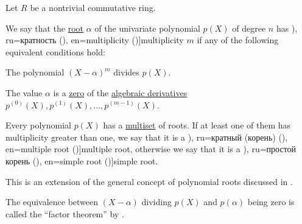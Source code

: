 \begin{definition}\label{def:multiple_root}\mimprovised
  Let \( R \) be a nontrivial commutative ring.

  We say that the \hyperref[def:root_of_polynomial]{root} \( \alpha \) of the univariate polynomial \( p(X) \) of degree \( n \) has \term[bg=кратност (\cite[171]{Обрешков1962ВисшаАлгебра}), ru=кратность (\cite[163]{Тыртышников2017Алгебра}), en=multiplicity (\cite[229]{Jacobson1985AlgebraI})]{multiplicity} \( m \) if any of the following equivalent conditions hold:
  \begin{thmenum}
     The polynomial \( (X - \alpha)^m \) divides \( p(X) \).

     The value \( \alpha \) is a \hyperref[def:root_of_polynomial]{zero} of the \hyperref[def:algebraic_derivative]{algebraic derivatives} \( p^{(0)}(X), p^{(1)}(X), \ldots, p^{(m-1)}(X) \).
  \end{thmenum}

  Every polynomial \( p(X) \) has a \hyperref[def:multiset]{multiset} of roots. If at least one of them has multiplicity greater than one, we say that it is a \term[bg=многократен (корен) (\cite[171]{Обрешков1962ВисшаАлгебра}), ru=кратный (корень) (\cite[163]{Тыртышников2017Алгебра}), en=multiple root (\cite[229]{Jacobson1985AlgebraI})]{multiple root}, otherwise we say that it is a \term[bg=прост корен (\cite[171]{Обрешков1962ВисшаАлгебра}), ru=простой корень (\cite[163]{Тыртышников2017Алгебра}), en=simple root (\cite[229]{Jacobson1985AlgebraI})]{simple root}.
\end{definition}
\begin{comments}
  \item This is an extension of the general concept of polynomial roots discussed in .

  \item The equivalence between \( (X - \alpha) \) dividing \( p(X) \) and \( p(\alpha) \) being zero is called the \enquote{factor theorem} by .
\end{comments}
